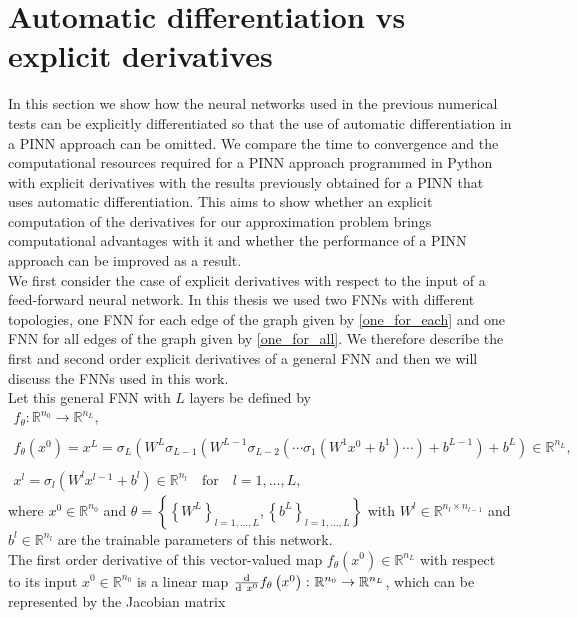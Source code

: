 \section{Automatic differentiation vs explicit derivatives}
\label{ch3:sec3}

In this section we show how the neural networks used in the previous numerical tests can be explicitly differentiated so that the use of automatic differentiation in a PINN approach can be omitted. We compare the time to convergence and the computational resources required for a PINN approach programmed in Python with explicit derivatives with the results previously obtained for a PINN that uses automatic differentiation. This aims to show whether an explicit computation of the derivatives for our approximation problem brings computational advantages with it and whether the performance of a PINN approach can be improved as a result. \\
We first consider the case of explicit derivatives with respect to the input of a feed-forward neural network. In this thesis we used two FNNs with different topologies, one FNN for each edge of the graph given by \cref{one_for_each} and one FNN for all edges of the graph given by \cref{one_for_all}. We therefore describe the first and second order explicit derivatives of a general FNN and then we will discuss the FNNs used in this work. \\
Let this general FNN with $L$ layers be defined by 
\begin{gather}
    \label{model prediction}
    f_{\theta} \colon \mathbb{R}^{n_0} \to \mathbb{R}^{n_L}, \\
    \\
    f_{\theta}\left(x^0\right) = x^L = \sigma_L\left(W^L \sigma_{L-1}\left(W^{L-1}\sigma_{L-2}\left(\cdots \sigma_{1}\left(W^{1}x^0 + b^1\right) \cdots\right) + b^{L-1}\right) + b^{L}\right) \in \mathbb{R}^{n_L}, \\
    \\
    x^l = \sigma_l\left(W^l x^{l-1} + b^l\right) \in \mathbb{R}^{n_l} \quad \text{for} \quad l = 1, \ldots, L,
\end{gather}
where $x^0 \in \mathbb{R}^{n_0}$ and $\theta = \left\{ \left\{ W^L \right\}_{l = 1, \ldots, L}, \left\{ b^L \right\}_{l = 1, \ldots, L} \right\}$ with $W^l \in \mathbb{R}^{n_l \times n_{l-1}}$ and $b^l \in \mathbb{R}^{n_l}$ are the trainable parameters of this network. \\
The first order derivative of this vector-valued map $f_{\theta}\left(x^0\right) \in \mathbb{R}^{n_L}$ with respect to its input $x^0 \in \mathbb{R}^{n_0}$ is a linear map $\frac{\textup{d}}{\textup{d} \ x^0} f_{\theta}\left(x^0\right) \colon \mathbb{R}^{n_0} \to \mathbb{R}^{n_L}$, which can be represented by the Jacobian matrix
